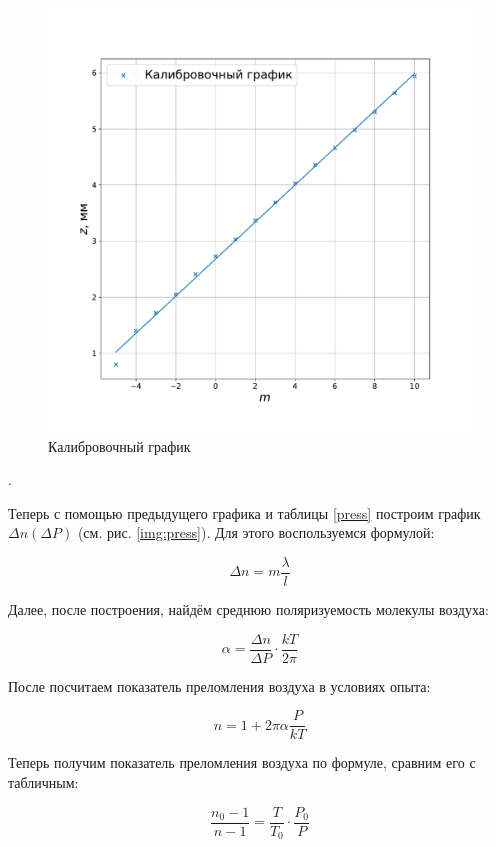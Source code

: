 \documentclass[a4paper, 12pt]{article}
\newcounter{Points}
\newcommand{\point}{\arabic{Points}. \addtocounter{Points}{1}}
\begin{document}
\begin{figure}[!h]
    \includegraphics[scale = 0.5]{kalib}
    \centering
    \caption{Калибровочный график}
    \label{img:kalib}
\end{figure}

\point Теперь с помощью предыдущего графика и таблицы \ref{press} построим график $\Delta n (\Delta P)$ (см. рис. \ref{img:press}). Для этого воспользуемся формулой:

\[
    \Delta n = m \frac{\lambda}{l}
\]

Далее, после построения, найдём среднюю поляризуемость молекулы воздуха:

\[
    \alpha = \frac{\Delta n}{\Delta P} \cdot \frac{kT}{2 \pi}
\]

После посчитаем показатель преломления воздуха в условиях опыта:

\[
    n = 1 + 2 \pi \alpha \frac{P}{kT}
\]

Теперь получим показатель преломления воздуха по формуле, сравним его с табличным:

\[
    \frac{n_0-1}{n-1} = \frac{T}{T_0} \cdot \frac{P_0}{P}
\]
\end{document}
